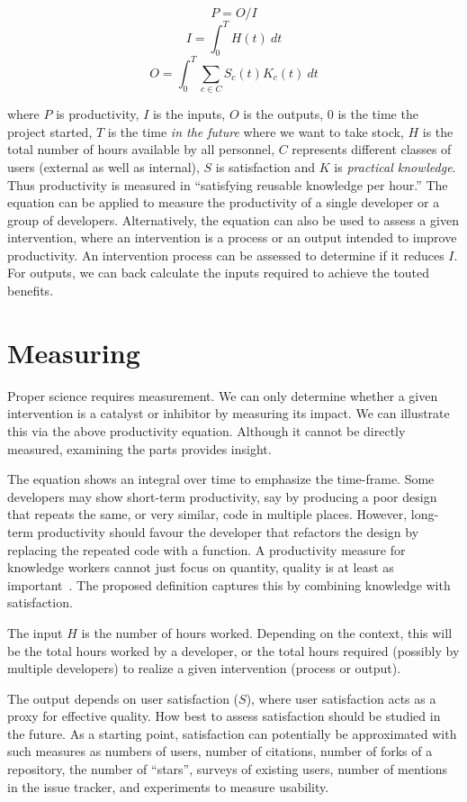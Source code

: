 \documentclass[sigconf, authorversion, nonacm]{acmart}
\begin{document}
$$P = O / I$$ 
$$ I = \int_{0}^{T} H(t)\ dt $$
$$ O = \int_{0}^{T} \sum_{c \in C} S_c(t) K_c(t)\ dt $$

\noindent where $P$ is productivity, $I$ is the inputs, $O$ is the outputs, $0$
is the time the project started, $T$ is the time \emph{in the future} where we
want to take stock, $H$ is the total number of hours available by all personnel,
$C$ represents different classes of users (external as well as internal), $S$ is
satisfaction and $K$ is \emph{practical knowledge}.  Thus productivity is
measured in ``satisfying reusable knowledge per hour.''  The equation can be
applied to measure the productivity of a single developer or a group of
developers. Alternatively, the equation can also be used to assess a given
intervention, where an intervention is a process or an output intended to
improve productivity.  An intervention process can be assessed to determine if
it reduces $I$.  For outputs, we can back calculate the inputs required to
achieve the touted benefits.

\section{Measuring}

Proper science requires measurement.  We can only determine whether a given
intervention is a catalyst or inhibitor by measuring its impact.  We can
illustrate this via the above productivity equation.  Although it cannot be
directly measured, examining the parts provides insight.

The equation shows an integral over time to emphasize the time-frame.  Some
developers may show short-term productivity, say by producing a poor design that
repeats the same, or very similar, code in multiple places. However, long-term
productivity should favour the developer that refactors the design by replacing
the repeated code with a function. A productivity measure for knowledge workers
cannot just focus on quantity, quality is at least as
important~\cite{Drucker1999}.  The proposed definition captures this by
combining knowledge with satisfaction.

The input $H$ is the number of hours worked.  Depending on the context, this
will be the total hours worked by a developer, or the total hours required
(possibly by multiple developers) to realize a given intervention (process or
output).

The output depends on user satisfaction ($S$), where user satisfaction acts as a
proxy for effective quality. How best to assess satisfaction should be studied
in the future.  As a starting point, satisfaction can potentially be
approximated with such measures as numbers of users, number of citations, number
of forks of a repository, the number of ``stars'', surveys of existing users,
number of mentions in the issue tracker, and experiments to measure usability.
\end{document}
